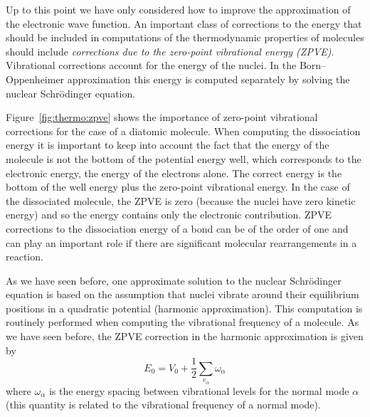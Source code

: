 \documentclass[../Main/notes.tex]{subfiles}
\begin{document}

Up to this point we have only considered how to improve the approximation of the electronic wave function.
An important class of corrections to the energy that should be included in computations of the thermodynamic properties of molecules should include \emph{corrections due to the zero-point vibrational energy (ZPVE)}.
Vibrational corrections account for the energy of the nuclei.
In the Born--Oppenheimer approximation this energy is computed separately by solving the nuclear Schr\"{o}dinger equation.

Figure~\ref{fig:thermo:zpve} shows the importance of zero-point vibrational corrections for the case of a diatomic molecule.
When computing the dissociation energy it is important to keep into account the fact that the energy of the molecule is not the bottom of the potential energy well, which corresponds to the electronic energy, the energy of the electrons alone.
The correct energy is the bottom of the well energy plus the zero-point vibrational energy.
In the case of the dissociated molecule, the ZPVE is zero (because the nuclei have zero kinetic energy) and so the energy contains only the electronic contribution.
ZPVE corrections to the dissociation energy of a bond can be of the order of one \kcal and can play an important role if there are significant molecular rearrangements in a reaction.

As we have seen before, one approximate solution to the nuclear Schr\"{o}dinger equation is based on the assumption that nuclei vibrate around their equilibrium positions in a quadratic potential (harmonic approximation).
This computation is routinely performed when computing the vibrational frequency of a molecule.
As we have seen before, the ZPVE correction in the harmonic approximation is given by
\begin{equation}
\label{eq:thermochemistry:zpve}
E_0 = V_0 + \frac{1}{2}  \sum_{v_\alpha} \omega_\alpha
\end{equation}
where $\omega_\alpha$ is the energy spacing between vibrational levels for the normal mode $\alpha$ (this quantity is related to the vibrational frequency of a normal mode).
\end{document}
